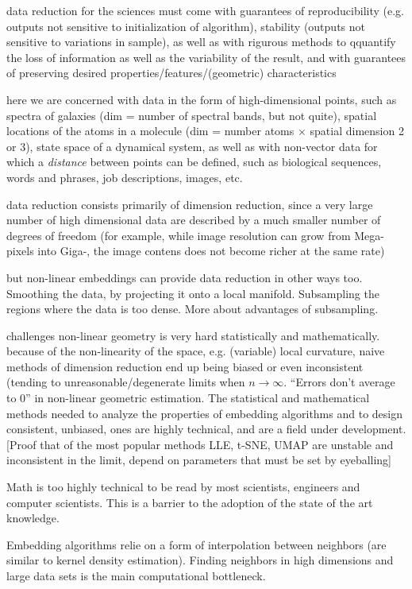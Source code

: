 \documentclass[floatfix,11pt]{revtex4-1}
\begin{document}
\bit
\item data reduction for the sciences must come with guarantees of reproducibility (e.g. outputs not sensitive to initialization of algorithm), stability (outputs not sensitive to variations in sample), as well as with rigurous methods to qquantify the loss of information as well as the variability of the result, and with guarantees of preserving desired properties/features/(geometric) characteristics
\item here we are concerned with data in the form of high-dimensional points, such as spectra of galaxies (dim = number of spectral bands, but not quite), spatial locations of the atoms in a molecule (dim = number atoms $\times$ spatial dimension 2 or 3), state space of a dynamical system, as well as with non-vector data for which a {\em distance} between points can be defined, such as biological sequences, words and phrases, job descriptions, images, etc.
\item data reduction consists primarily of dimension reduction, since a very large number of high dimensional data are described by a much smaller number of degrees of freedom (for example, while image resolution can grow from Mega-pixels into Giga-, the image contens does not become richer at the same rate)
\item but non-linear embeddings can provide data reduction in other ways too. Smoothing the data, by projecting it onto a local manifold. Subsampling the regions where the data is too dense. More about advantages of subsampling. 
\item[challenges] non-linear geometry is very hard statistically and mathematically. because of the non-linearity of the space, e.g.  (variable) local curvature, naive methods of dimension reduction end up being biased or even inconsistent (tending to unreasonable/degenerate limits when $n\rightarrow \infty$. ``Errors don't average to 0'' in non-linear geometric estimation. The statistical and mathematical methods needed to analyze the properties of embedding algorithms and to design consistent, unbiased, ones are highly technical, and are a field under development. [Proof that of the most popular methods LLE, t-SNE, UMAP are unstable and inconsistent in the limit, depend on parameters that must be set by eyeballing]
\item Math is too highly technical to be read by most scientists, engineers and computer scientists. This is a barrier to the adoption of the state of the art knowledge. 
\item Embedding algorithms relie on a form of interpolation between neighbors (are similar to kernel density estimation). Finding neighbors in high dimensions and large data sets is the main computational bottleneck. 
\end{document}

